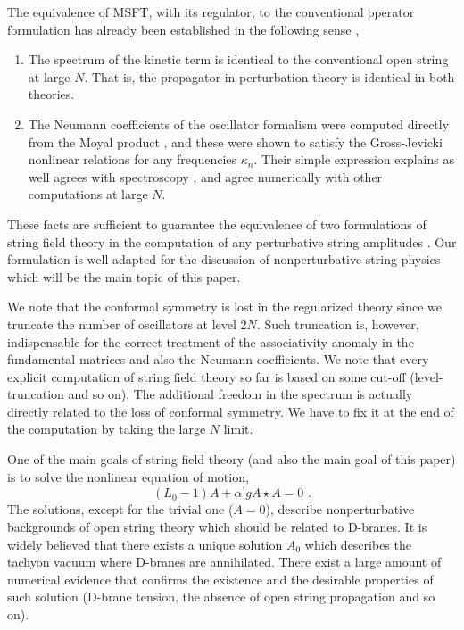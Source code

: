 \documentclass[a4paper,aps,preprint,nofootinbib,eqsecnum]{revtex4}
\begin{document}
The equivalence of MSFT, with its regulator, to the conventional operator
formulation has already been established in the following sense
\cite{BKM1},

\begin{enumerate}
\item The spectrum of the kinetic term is identical to the conventional open
string at large $N$. That is, the propagator in perturbation theory is
identical in both theories.

\item The Neumann coefficients of the oscillator formalism were computed
directly from the Moyal product \cite{BM2}\cite{PREP}, and these were shown
to satisfy the Gross-Jevicki nonlinear relations \cite{GJ} for any
frequencies $\kappa _{n}$. Their simple expression explains as well agrees
with spectroscopy \cite{spectroscopy}, and agree numerically with other
computations at large $N$.
\end{enumerate}

These facts are sufficient to guarantee the equivalence of two formulations
of string field theory in the computation of any perturbative string
amplitudes \cite{BKM1}. Our formulation is well adapted for the discussion
of nonperturbative string physics which will be the main topic of this paper.

We note that the conformal symmetry is lost in the regularized theory since
we truncate the number of oscillators at level $2N$. Such truncation is,
however, indispensable for the correct treatment of the associativity
anomaly in the fundamental matrices \cite{BM1} and also the Neumann
coefficients. We note that every explicit computation of string field theory
so far is based on some cut-off (level-truncation and so on). The additional
freedom in the spectrum is actually directly related to the loss of
conformal symmetry. We have to fix it at the end of the computation by
taking the large $N$ limit.

One of the main goals of string field theory (and also the main goal of this
paper) is to solve the nonlinear equation of motion,
\begin{equation}
(L_{0}-1)A+{\alpha ^{\prime }}gA\star A=0\,\,.  \label{eom}
\end{equation}%
The solutions, except for the trivial one ($A=0$), describe nonperturbative
backgrounds of open string theory which should be related to D-branes. It is
widely believed that there exists a unique solution $A_{0}$ which describes
the tachyon vacuum where D-branes are annihilated. There exist a large
amount of numerical evidence \cite{Numerics} that confirms the existence and
the desirable properties of such solution (D-brane tension, the absence of
open string propagation and so on).
\end{document}
